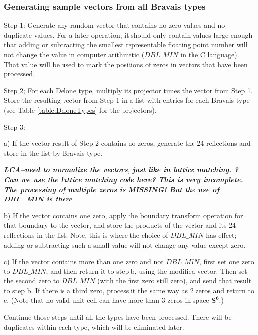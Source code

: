 \documentclass[preprint]{iucr}              %
\newcommand{\SVI}[0]{$\mathbf{S^{6}}$}
\begin{document}
	\subsubsection{Generating sample vectors from all Bravais types\protect\\}
	
	Step 1: Generate any random vector that contains no zero 
	values and no duplicate values.  For a later operation, 
	it should only contain values large enough that adding or
	subtracting the smallest
	representable floating point number will not change the 
	value in computer arithmetic ($DBL\_MIN$ in the C language).
	That value will be used to mark the positions of zeros
	in vectors that have been processed.
	
	
	
	Step 2; For each Delone type, multiply its projector times 
	the vector from Step 1. Store  the resulting vector
	from Step 1 in a list 
	with entries for each Bravais type (see Table \ref{table:DeloneTypes} 
	for the projectors).
	
	Step 3:
	
	a) If the vector result of Step 2 contains no zeros, generate the 24 reflections
	and store in the list by Bravais type. 
	

	\textit{\textbf{LCA--need to normalize the vectors, just like 
		in lattice matching. ? Can we use the 
		lattice matching code here? This is very 
		incomplete. The processing of multiple zeros is MISSING! But the use of DBL\_MIN is there.}}
	
	
	
	b) If the vector contains one zero, apply the boundary transform 
	operation for that boundary
	to the vector, and
	store the products of the vector and its 24 reflections in the list. Note, 
	this is where the choice of $DBL\_MIN$ has effect; adding or
	subtracting such a small value will not change
	any value except zero.
	
	c) If the vector contains more than one zero and \underline{not} $DBL\_MIN$, 
	first set one zero to $DBL\_MIN$,  and then return it to 
	step b, using the modified vector. Then set the second zero to $DBL\_MIN$ (with the
	first zero still zero), and send that result to step b. 
	If there is a third zero,  process it the same way as 2 zeros and return to c.
	(Note that no valid unit cell can have more than 3 zeros
	in space \SVI{}.)
	
	Continue those steps until all the types have been processed. 
	There will be duplicates within each type,
	which will be eliminated later.
	
\end{document}
